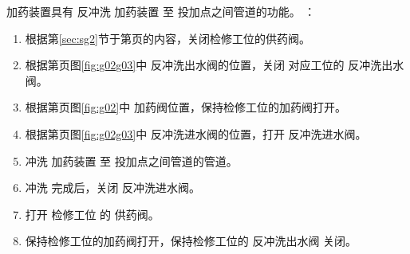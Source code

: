 
加药装置具有 反冲洗 加药装置 至 投加点之间管道的功能。
：
\begin{enumerate}
    \item 根据第\ref{sec:sg2}节于第\pageref{sec:sg2}页的内容，关闭检修工位的供药阀。
    \item 根据第\pageref{fig:g02g03}页图\ref{fig:g02g03}中 反冲洗出水阀的位置，关闭 对应工位的 反冲洗出水阀。
    \item 根据第\pageref{sec:sg-1}页图\ref{fig:g02}中 加药阀位置，保持检修工位的加药阀打开。
    \item 根据第\pageref{fig:g02g03}页图\ref{fig:g02g03}中 反冲洗进水阀的位置，打开 反冲洗进水阀。
    \item 冲洗 加药装置 至 投加点之间管道的管道。
    \item 冲洗 完成后，关闭 反冲洗进水阀。
    \item 打开 检修工位 的 供药阀。
    \item 保持检修工位的加药阀打开，保持检修工位的 反冲洗出水阀 关闭。
\end{enumerate}

